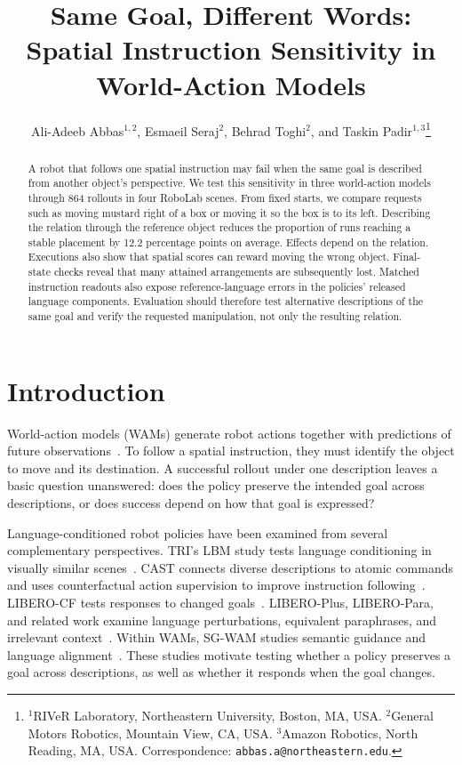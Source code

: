 \documentclass{article}
\title{Same Goal, Different Words:\\Spatial Instruction Sensitivity in World-Action Models}
\author{Ali-Adeeb Abbas$^{1,2}$, Esmaeil Seraj$^2$, Behrad Toghi$^2$, and Taskin Padir$^{1,3}$\thanks{$^1$RIVeR Laboratory, Northeastern University, Boston, MA, USA. $^2$General Motors Robotics, Mountain View, CA, USA. $^3$Amazon Robotics, North Reading, MA, USA. Correspondence: \texttt{abbas.a@northeastern.edu}.}}
\begin{document}
\maketitle
\begin{abstract}
A robot that follows one spatial instruction may fail when the same goal is described from another object's perspective. We test this sensitivity in three world-action models through 864 rollouts in four RoboLab scenes. From fixed starts, we compare requests such as moving mustard right of a box or moving it so the box is to its left. Describing the relation through the reference object reduces the proportion of runs reaching a stable placement by 12.2 percentage points on average. Effects depend on the relation. Executions also show that spatial scores can reward moving the wrong object. Final-state checks reveal that many attained arrangements are subsequently lost. Matched instruction readouts also expose reference-language errors in the policies' released language components. Evaluation should therefore test alternative descriptions of the same goal and verify the requested manipulation, not only the resulting relation.
\end{abstract}

\setlength{\parskip}{2.5pt}
\section{Introduction}
World-action models (WAMs) generate robot actions together with predictions of future observations~\citep{kim2026cosmospolicy}. To follow a spatial instruction, they must identify the object to move and its destination. A successful rollout under one description leaves a basic question unanswered: does the policy preserve the intended goal across descriptions, or does success depend on how that goal is expressed?

Language-conditioned robot policies have been examined from several complementary perspectives. TRI's LBM study tests language conditioning in visually similar scenes~\citep{tri2025lbm}. CAST connects diverse descriptions to atomic commands and uses counterfactual action supervision to improve instruction following~\citep{glossop2025cast}. LIBERO-CF tests responses to changed goals~\citep{fang2026counterfactual}. LIBERO-Plus, LIBERO-Para, and related work examine language perturbations, equivalent paraphrases, and irrelevant context~\citep{fei2026liberoplus,kim2026liberopara,moskalenko2026bring}. Within WAMs, SG-WAM studies semantic guidance and language alignment~\citep{he2026sgwam}. These studies motivate testing whether a policy preserves a goal across descriptions, as well as whether it responds when the goal changes.
\end{document}
